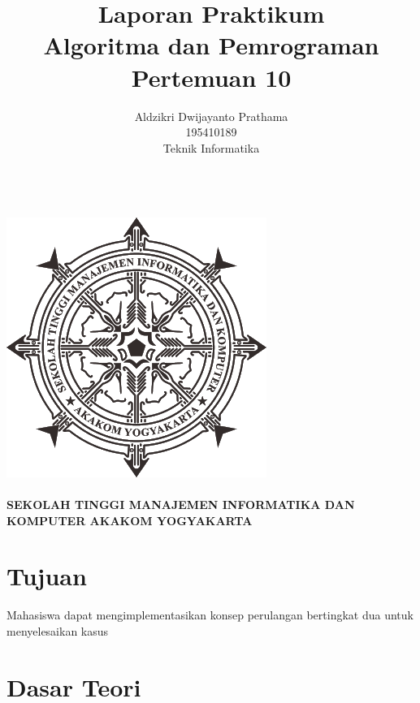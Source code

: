 \documentclass[a4paper,12pt]{article}
\begin{document}
\title{ {\Large Laporan Praktikum}\\ Algoritma dan Pemrograman \\{\Large Pertemuan 10}}

\author{Aldzikri Dwijayanto Prathama 
	\\195410189
	\\Teknik Informatika}
\makeatletter
\begin{titlepage}
	\begin{center}
		{\huge \bfseries \@title }\\[14ex]
		\includegraphics[scale=.8]{logo}\\[4ex]
		{\large \@author}\\[19ex]
		{\large \bfseries {SEKOLAH TINGGI MANAJEMEN INFORMATIKA DAN KOMPUTER
				AKAKOM YOGYAKARTA}}
	\end{center}


\end{titlepage}
\makeatother
\newpage
\tableofcontents
\newpage

\section{Tujuan}
Mahasiswa dapat mengimplementasikan konsep perulangan bertingkat dua untuk
menyelesaikan kasus

\section{Dasar Teori}
\end{document}
